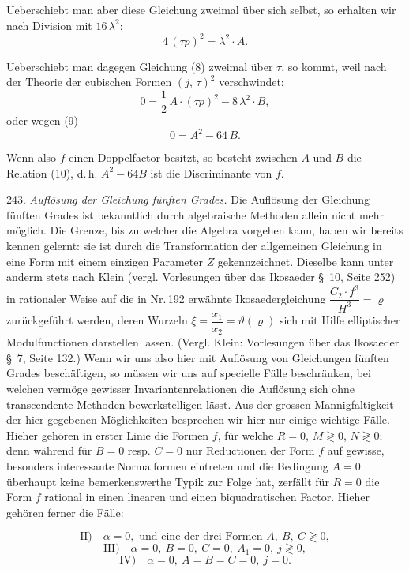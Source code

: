 \documentclass[11pt]{article}
\providecommand{\weberpage}[1]{}
\providecommand{\weq}[2]{\begin{equation}\tag{#1}#2\end{equation}}
\begin{document}
Ueberschiebt man aber diese Gleichung zweimal \"uber sich selbst, so erhalten wir nach Division mit $16\,\lambda^2$:
\weq{9}{4\,(\tau p)^2 = \lambda^2\cdot A.}

Ueberschiebt man dagegen Gleichung (8) zweimal \"uber $\tau$, so kommt, weil nach der Theorie der cubischen Formen $(j,\,\tau)^2$ verschwindet:
\[
0 = \frac{1}{2}\,A\cdot(\tau p)^2 - 8\,\lambda^2\cdot B,
\]
oder wegen (9)
\weq{10}{0 = A^2 - 64\,B.}

Wenn also $f$ einen Doppelfactor besitzt, so besteht zwischen $A$ und $B$ die Relation (10), d.\,h. $A^2-64B$ ist die Discriminante von $f$.

243. \textit{Aufl\"osung der Gleichung f\"unften Grades.} Die Aufl\"osung der Gleichung f\"unften Grades ist bekanntlich durch algebraische Methoden allein nicht mehr m\"oglich. Die Grenze, bis zu welcher die Algebra vorgehen kann, haben wir bereits kennen gelernt: sie ist durch die Transformation der allgemeinen Gleichung in eine Form mit einem einzigen Parameter $Z$ gekennzeichnet. Dieselbe kann unter anderm stets nach Klein (vergl. \glqq Vorlesungen \"uber das Ikosaeder\grqq{} \S~10, Seite 252) in rationaler Weise auf die in Nr.\,192 erw\"ahnte Ikosaedergleichung $\dfrac{C_2\cdot f^3}{H^3} = \varrho$ zur\"uckgef\"uhrt werden, deren Wurzeln $\xi = \dfrac{x_1}{x_2} = \vartheta(\varrho)$ sich mit Hilfe elliptischer Modulfunctionen darstellen lassen. (Vergl. Klein: \glqq Vorlesungen \"uber das Ikosaeder\grqq{} \S~7, Seite 132.) Wenn wir uns also hier mit Aufl\"osung von Gleichungen f\"unften Grades besch\"aftigen, so m\"ussen wir uns auf specielle F\"alle beschr\"anken, bei welchen verm\"oge gewisser Invariantenrelationen die Aufl\"osung sich ohne transcendente Methoden bewerkstelligen l\"asst. Aus der grossen Mannigfaltigkeit der hier gegebenen M\"oglichkeiten besprechen wir hier nur einige wichtige F\"alle. Hieher geh\"oren in erster Linie die Formen $f$, f\"ur welche $R=0$, $M\gtrless 0$, $N\gtrless 0$; denn w\"ahrend f\"ur $B=0$ resp. $C=0$ nur Reductionen der Form $f$ auf gewisse, besonders interessante Normalformen eintreten und die Bedingung $A=0$ \"uberhaupt keine bemerkenswerthe Typik zur Folge hat, zerf\"allt f\"ur $R=0$ die Form $f$ rational in einen linearen und einen biquadratischen Factor. Hieher geh\"oren ferner die F\"alle:


\weberpage{270}
\[
\text{II)}\quad \alpha = 0, \text{ und eine der drei Formen } A,\ B,\ C\gtrless 0,
\]
\[
\text{III)}\quad \alpha = 0,\ B=0,\ C=0,\ A_1=0,\ j\gtrless 0,
\]
\[
\text{IV)}\quad \alpha = 0,\ A=B=C=0,\ j=0.
\]
\end{document}
